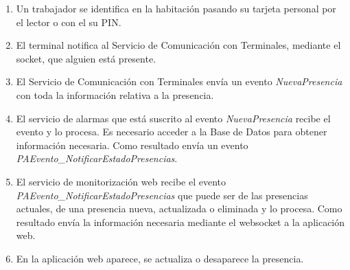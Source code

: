 \begin{enumerate}
	\item Un trabajador se identifica en la habitación pasando su tarjeta personal por el lector o con el su PIN.
	\item El terminal notifica al Servicio de Comunicación con Terminales, mediante el socket, que alguien está presente.
	\item El Servicio de Comunicación con Terminales envía un evento \textit{NuevaPresencia} con toda la información relativa a la presencia.
	\item El servicio de alarmas que está suscrito al evento \textit{NuevaPresencia} recibe el evento y lo procesa. Es necesario acceder a la Base de Datos para obtener información necesaria. Como resultado envía un evento \textit{PAEvento\_NotificarEstadoPresencias}.
	\item El servicio de monitorización web recibe el evento \textit{PAEvento\_NotificarEstadoPresencias} que puede ser de las presencias actuales, de una presencia nueva, actualizada o eliminada y lo procesa. Como resultado envía la información necesaria mediante el websocket a la aplicación web.
	\item En la aplicación web aparece, se actualiza o desaparece la presencia.
\end{enumerate}




